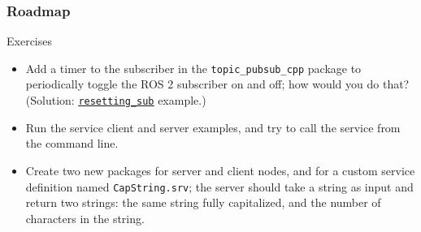 \documentclass[aspectratio=169]{beamer}
\begin{document}
\frame{\titlepage}



\begin{frame}
	\frametitle{Roadmap}
	\tableofcontents
\end{frame}







\begin{frame}{Exercises}
	\begin{itemize}
    \item Add a timer to the subscriber in the \texttt{topic\_pubsub\_cpp} package to periodically toggle the ROS 2 subscriber on and off; how would you do that?\\
    (Solution: \href{https://github.com/IntelligentSystemsLabUTV/ros2-examples/blob/humble/src/cpp/topic_pubsub_cpp/src/resetting_sub.cpp}{\color{blue}\underline{\texttt{resetting\_sub}}} example.)
		\item Run the service client and server examples, and try to call the service from the command line.
		\item Create two new packages for server and client nodes, and for a custom service definition named \texttt{CapString.srv}; the server should take a string as input and return two strings: the same string fully capitalized, and the number of characters in the string.
	\end{itemize}
\end{frame}
\end{document}
